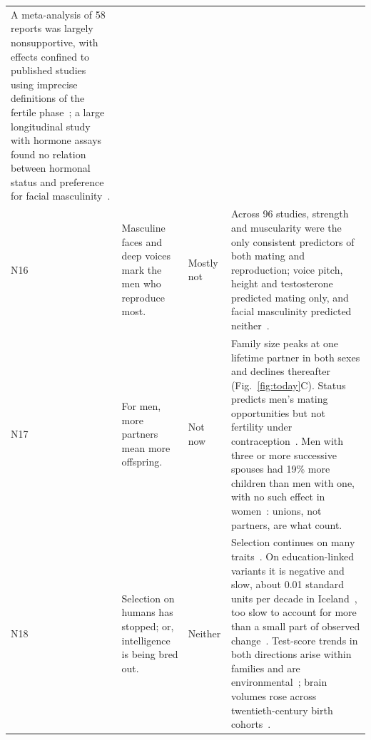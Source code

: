 \begin{table}[t]
\begin{tabularx}{\textwidth}{@{}P{0.028\textwidth}P{0.20\textwidth}P{0.10\textwidth}L@{}}
A meta-analysis of 58 reports was largely nonsupportive, with effects confined to published studies using imprecise
definitions of the fertile phase~\cite{wood2014}; a large longitudinal study with hormone assays found no relation between
hormonal status and preference for facial masculinity~\cite{jones2018}.\\
\addlinespace
N16 & Masculine faces and deep voices mark the men who reproduce most. & Mostly not &
Across 96 studies, strength and muscularity were the only consistent predictors of both mating and reproduction; voice
pitch, height and testosterone predicted mating only, and facial masculinity predicted neither~\cite{lidborg2022}.\\
\addlinespace
N17 & For men, more partners mean more offspring. & Not now &
Family size peaks at one lifetime partner in both sexes and declines thereafter (Fig.~\ref{fig:today}C). Status predicts men's
mating opportunities but not fertility under contraception~\cite{perusse1993}. Men with three or more successive spouses had 19\%
more children than men with one, with no such effect in women~\cite{jokela2010}: unions, not partners, are what count.\\
\addlinespace
N18 & Selection on humans has stopped; or, intelligence is being bred out. & Neither &
Selection continues on many traits~\cite{byars2010,sanjak2018,gardner2022,akbari2026}. On education-linked variants it is negative
and slow, about 0.01 standard units per decade in Iceland~\cite{kong2017}, too slow to account for more than a small part of
observed change~\cite{beauchamp2016}. Test-score trends in both directions arise within families and are
environmental~\cite{bratsberg2018}; brain volumes rose across twentieth-century birth cohorts~\cite{decarli2024}.\\
\bottomrule
\end{tabularx}
\end{table}
